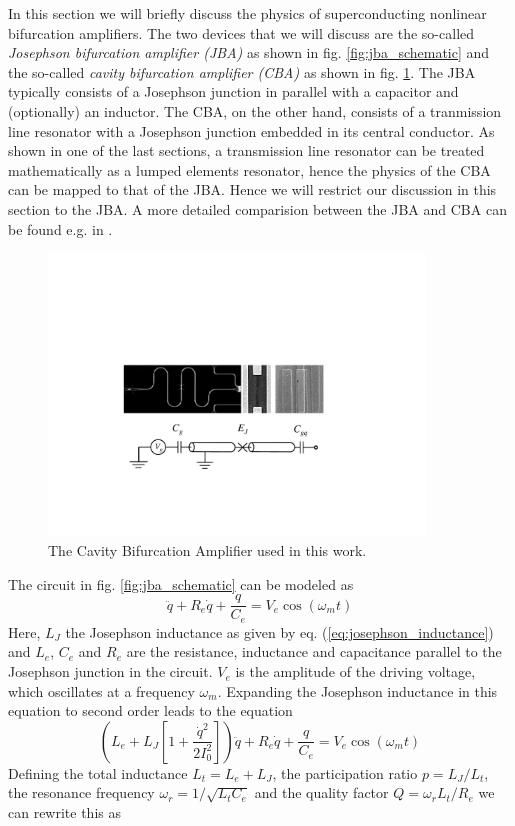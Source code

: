 In this section we will briefly discuss the physics of superconducting nonlinear bifurcation amplifiers. The two devices that we will discuss are the so-called {\it Josephson bifurcation amplifier (JBA)} as shown in fig. \ref{fig:jba_schematic} and the so-called {\it cavity bifurcation amplifier (CBA)} as shown in fig. \ref{fig:cba_schematic}. The JBA typically consists of a Josephson junction in parallel with a capacitor and (optionally) an inductor. The CBA, on the other hand, consists of a tranmission line resonator with a Josephson junction embedded in its central conductor. As shown in one of the last sections, a transmission line resonator can be treated mathematically as a lumped elements resonator, hence the physics of the CBA can be mapped to that of the JBA. Hence we will restrict our discussion in this section to the JBA. A more detailed comparision between the JBA and CBA can be found e.g. in \cite{palacios-laloy_superconducting_2010}.


\begin{figure}
	\includegraphics[width=10cm]{"./material/figures/introduction/jba"}
	\caption{The Cavity Bifurcation Amplifier used in this work.}
	\label{fig:cba_schematic}
\end{figure}

The circuit in fig. \ref{fig:jba_schematic} can be modeled as
%
\begin{equation}
[L_e+L_J (i)]\ddot{q}+R_e \dot{q}+\frac{q}{C_e} = V_e \cos{\left(\omega_m t\right)}
\end{equation}
%
Here, $L_J$ the Josephson inductance as given by eq. (\ref{eq:josephson_inductance}) and $L_e$, $C_e$ and $R_e$ are the resistance, inductance and capacitance parallel to the Josephson junction in the circuit. $V_e$ is the amplitude of the driving voltage, which oscillates at a frequency $\omega_m$. Expanding the Josephson inductance in this equation to second order leads to the equation
%
\begin{equation}
\left(L_e+L_J\left[1+\frac{\dot{q}^2}{2 I_0^2}\right]\right)\ddot{q}+R_e \dot{q}+\frac{q}{C_e} = V_e \cos{\left( \omega_m t\right)}
\end{equation}
%
Defining the total inductance $L_t = L_e+L_J$, the participation ratio $p=L_J/L_t$, the resonance frequency $\omega_r = 1/\sqrt{L_t C_e}$ and the quality factor $Q = \omega_r L_t / R_e$ we can rewrite this as


